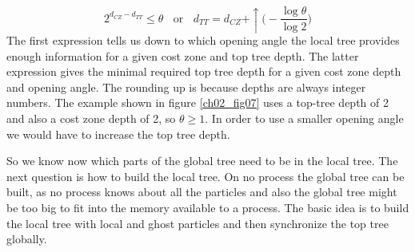 \begin{equation}
2^{d_{CZ} - d_{TT}} \le \theta ~~~~\text{or}~~~~ d_{TT} = d_{CZ} + \uparrow \Big( - \frac{ \log{\theta} }{\log{2} } \Big)
\end{equation}
The first expression tells us down to which opening angle the local tree provides enough information for a given cost zone and top tree depth. The latter expression gives the minimal required top tree depth for a given cost zone depth and opening angle. The rounding up is because depths are always integer numbers. The example shown in figure \ref{ch02_fig07} uses a top-tree depth of 2 and also a cost zone depth of 2, so $\theta \ge 1$. In order to use a smaller opening angle we would have to increase the top tree depth.

So we know now which parts of the global tree need to be in the local tree. The next question is how to build the local tree. On no process the global tree can be built, as no process knows about all the particles and also the global tree might be too big to fit into the memory available to a process. The basic idea is to build the local tree with local and ghost particles and then synchronize the top tree globally.

